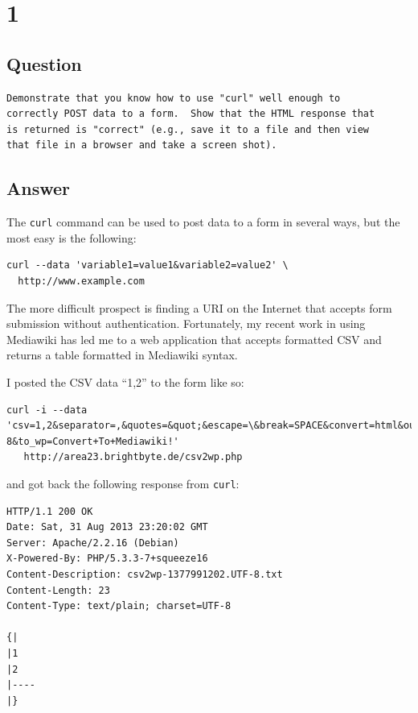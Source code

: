 \documentclass[letterpaper,11pt]{article}
\begin{document}
\section*{1}

\subsection*{Question}

\begin{verbatim}
Demonstrate that you know how to use "curl" well enough to
correctly POST data to a form.  Show that the HTML response that
is returned is "correct" (e.g., save it to a file and then view
that file in a browser and take a screen shot).
\end{verbatim}

\subsection*{Answer}

The \verb+curl+ command can be used to post data to a form in several ways, but the most easy is the following:
\begin{lstlisting}[frame=single]
curl --data 'variable1=value1&variable2=value2' \
  http://www.example.com
\end{lstlisting}

The more difficult prospect is finding a URI on the Internet that accepts form submission without authentication.  Fortunately, my recent work in using Mediawiki has led me to a web application that accepts formatted CSV and returns a table formatted in Mediawiki syntax.

I posted the CSV data ``1,2'' to the form like so:
\begin{lstlisting}[frame=single]
curl -i --data 'csv=1,2&separator=,&quotes=&quot;&escape=\&break=SPACE&convert=html&output_encoding=UTF-8&to_wp=Convert+To+Mediawiki!'
   http://area23.brightbyte.de/csv2wp.php
\end{lstlisting}

and got back the following response from \verb+curl+:
\begin{lstlisting}[frame=single]
HTTP/1.1 200 OK
Date: Sat, 31 Aug 2013 23:20:02 GMT
Server: Apache/2.2.16 (Debian)
X-Powered-By: PHP/5.3.3-7+squeeze16
Content-Description: csv2wp-1377991202.UTF-8.txt
Content-Length: 23
Content-Type: text/plain; charset=UTF-8

{|
|1
|2
|----
|}
\end{lstlisting}
\end{document}
